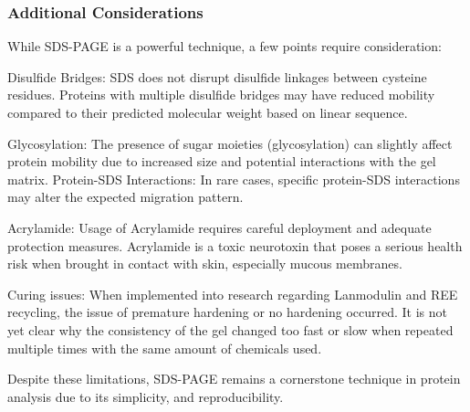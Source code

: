 \subsubsection{Additional Considerations}
While SDS-PAGE is a powerful technique, a few points require consideration:

Disulfide Bridges: SDS does not disrupt disulfide linkages between cysteine residues.
Proteins with multiple disulfide bridges may have reduced mobility compared to their
predicted molecular weight based on linear sequence.

Glycosylation: The presence of sugar moieties (glycosylation) can slightly affect protein
mobility due to increased size and potential interactions with the gel matrix.
Protein-SDS Interactions: In rare cases, specific protein-SDS interactions may alter the
expected migration pattern.

Acrylamide: Usage of Acrylamide requires careful deployment and adequate protection
measures. Acrylamide is a toxic neurotoxin that poses a serious health risk when brought
in contact with skin, especially mucous membranes.

Curing issues: When implemented into research regarding Lanmodulin and REE recycling,
the issue of premature hardening or no hardening occurred. It is not yet clear why the
consistency of the gel changed too fast or slow when repeated multiple times with the
same amount of chemicals used.

Despite these limitations, SDS-PAGE remains a cornerstone technique in protein analysis
due to its simplicity, and reproducibility.

\newpage
